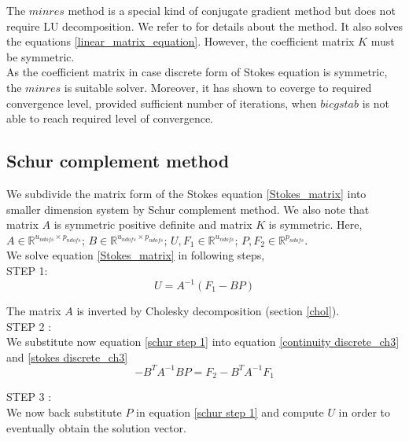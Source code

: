 \documentclass[a4paper,openany]{book}
\begin{document}
The $minres$ method is a special kind of conjugate gradient method but does not require LU decomposition. We refer to \cite{minres} for details about the method. It also solves the equations \ref{linear_matrix_equation}. However, the coefficient matrix $K$ must be symmetric. \\

As the coefficient matrix in case discrete form of Stokes equation is symmetric, the $minres$ is suitable solver. Moreover, it has shown to coverge to required convergence level, provided sufficient number of iterations, when $bicgstab$ is not able to reach required level of convergence.

\subsection{Schur complement method} \label{schur}

We subdivide the matrix form of the Stokes equation \eqref{Stokes_matrix} into smaller dimension system by Schur complement method. We also note that matrix $A$ is symmetric positive definite and matrix $K$ is symmetric.
Here, $A \in \mathbb{R}^{u_{ndofs} \times p_{ndofs}}$; $B \in \mathbb{R}^{u_{ndofs} \times p_{ndofs}}$; $U,F_1 \in \mathbb{R}^{u_{ndofs}}$; $P, F_2 \in \mathbb{R}^{p_{ndofs}}$. \\

We solve equation \eqref{Stokes_matrix} in following steps,\\

STEP 1: \\ 
\begin{equation}\label{schur step 1}
U = A^{-1}(F_1 - BP) 
\end{equation}

The matrix $A$ is inverted by Cholesky decomposition (section \ref{chol}). \\

STEP 2 : \\
We substitute now equation \eqref{schur step 1} into equation \eqref{continuity discrete_ch3} and \eqref{stokes discrete_ch3}
\begin{equation}\label{schur step 2}
- B^T A^{-1} B P = F_2 - B^T A^{-1} F_1
\end{equation}

STEP 3 : \\
We now back substitute $P$ in equation \eqref{schur step 1} and compute $U$ in order to eventually obtain the solution vector.
\\
\end{document}
